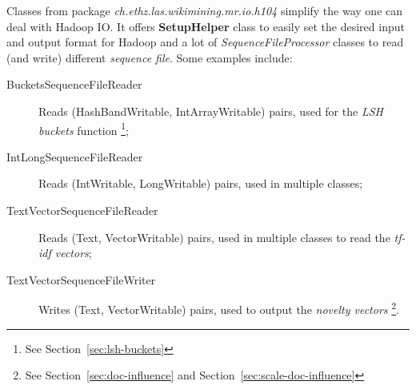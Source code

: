 Classes from package \emph{ch.ethz.las.wikimining.mr.io.h104} simplify the way
one can deal with Hadoop \ac{IO}.
It offers \textbf{SetupHelper} class to easily set the desired input and output
format for Hadoop and a lot of \emph{SequenceFileProcessor} classes to read
(and write) different \emph{sequence file}.
Some examples include:
\begin{description}
  \item[BucketsSequenceFileReader] Reads (HashBandWritable, IntArrayWritable)
  pairs, used for the \emph{\ac{LSH} buckets} function \footnote{See
  Section~\vref{sec:lsh-buckets}};
  \item[IntLongSequenceFileReader] Reads (IntWritable, LongWritable) pairs,
  used in multiple classes;
  \item[TextVectorSequenceFileReader] Reads (Text, VectorWritable) pairs, used
  in multiple classes to read the \emph{tf-idf vectors};
  \item[TextVectorSequenceFileWriter] Writes (Text, VectorWritable) pairs, used
  to output the \emph{novelty vectors} \footnote{See Section~\vref{sec:doc-influence} and Section~\vref{sec:scale-doc-influence}}.
\end{description}

